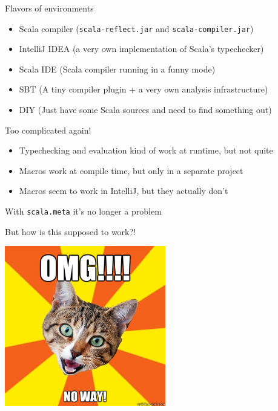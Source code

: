 \documentclass[svgnames,dvipsnames,hyperref={bookmarks=false},usepdftitle=false]{beamer}
\begin{document}
\begin{frame}{Flavors of environments}
\begin{itemize}
\item Scala compiler (\texttt{scala-reflect.jar} and \texttt{scala-compiler.jar})
\item IntelliJ IDEA (a very own implementation of Scala's typechecker)
\item Scala IDE (Scala compiler running in a funny mode)
\item SBT (A tiny compiler plugin + a very own analysis infrastructure)
\item DIY (Just have some Scala sources and need to find something out)
\end{itemize}
\end{frame}

\begin{frame}{Too complicated again!}
\begin{itemize}
\item Typechecking and evaluation kind of work at runtime, but not quite
\item Macros work at compile time, but only in a separate project
\item Macros seem to work in IntelliJ, but they actually don't
\end{itemize}
\end{frame}

\begin{frame}{With \texttt{scala.meta} it's no longer a problem}
\vskip35pt
\begin{center}
\end{center}
\end{frame}

\begin{frame}[c, fragile]{But how is this supposed to work?!}
\begin{center}
\includegraphics[height=7cm]{noway.jpg}
\end{center}
\end{frame}
\end{document}
